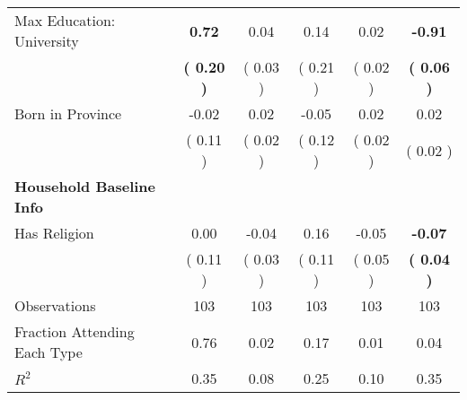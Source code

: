 \begin{table}[H]
{\begin{tabular}{lccccc}
\quad Max Education: University & \textbf{     0.72} &      0.04 &      0.14 &      0.02 & \textbf{    -0.91} \\
\quad  & \textbf{(     0.20 )} & (     0.03 )  & (     0.21 )  & (     0.02 ) & \textbf{(     0.06 )} \\
\quad Born in Province &     -0.02 &      0.02 &     -0.05 &      0.02 &      0.02 \\
\quad  & (     0.11 ) & (     0.02 )  & (     0.12 )  & (     0.02 ) & (     0.02 ) \\
\midrule
\textbf{Household Baseline Info} \\
\quad Has Religion &      0.00 &     -0.04 &      0.16 &     -0.05 & \textbf{    -0.07} \\
\quad  & (     0.11 ) & (     0.03 )  & (     0.11 )  & (     0.05 ) & \textbf{(     0.04 )} \\
\midrule
Observations & 103 & 103 & 103 & 103 & 103 \\
Fraction Attending Each Type &      0.76 &      0.02 &      0.17 &      0.01 &      0.04 \\
\midrule
$ R^2$ &      0.35 &      0.08 &      0.25 &      0.10 &      0.35 \\
\bottomrule
\end{tabular}}
\end{table}
